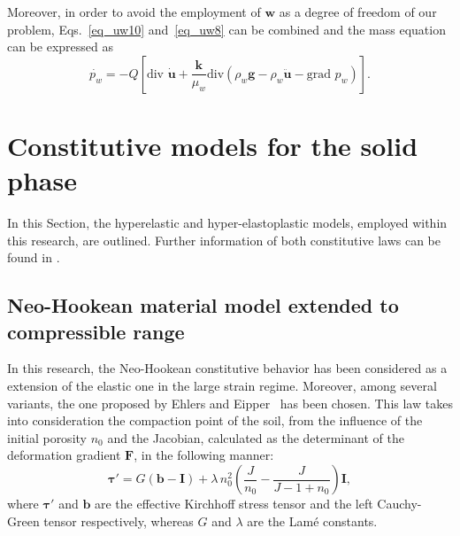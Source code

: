 \documentclass[twocolumn]{svjour3}          %
\begin{document}
Moreover, in order to avoid the employment of $\boldsymbol{w}$ as a degree of freedom of our problem, Eqs.~\eqref{eq_uw10} and~\eqref{eq_uw8} can be combined and the mass equation can be expressed as
\begin{equation}\label{eq_uw11}
\dot{p_w} = -Q\left [ \mbox{div } \dot{\boldsymbol{u}} + \frac{\boldsymbol{k}}{\mu_w} \mbox{div}\left(   \rho_w \boldsymbol{g} - \rho_w \ddot{\boldsymbol{u}} - \mbox{grad }p_w\right)\right ].
\end{equation}


\section{Constitutive models for the solid phase} \label{sec:3}
In this Section, the hyperelastic and hyper-elastoplastic models, employed within this research, are outlined. Further information of both constitutive laws can be found in \cite{Navas2018,Navas:17b,Navas:17c}.
\subsection{Neo-Hookean material model extended to compressible range} \label{subsec:31}

In this research, the Neo-Hookean constitutive behavior has been considered as a extension of the elastic one in the large strain regime. Moreover, among several variants, the one proposed by Ehlers and Eipper~\cite{Ehlers:99} has been chosen. This law takes into consideration the compaction point of the soil, from the influence of  the initial porosity  $n_0$ and the Jacobian, calculated as the determinant of the deformation gradient $\boldsymbol{F}$, in the following manner:
\begin{equation}\label{eq_nh2}
\boldsymbol{\tau}'=G(\boldsymbol{b}-\textbf{I})+\lambda \, n_0^2\left(  \frac{J}{n_0}-\frac{J}{J-1+n_0} \right)\textbf{I},
\end{equation}
where $\boldsymbol{\tau}'$ and  $\boldsymbol{b}$ are the effective Kirchhoff stress tensor and the left Cauchy-Green tensor respectively, whereas $G$ and $\lambda$ are the Lam\'e constants.  
\end{document}
